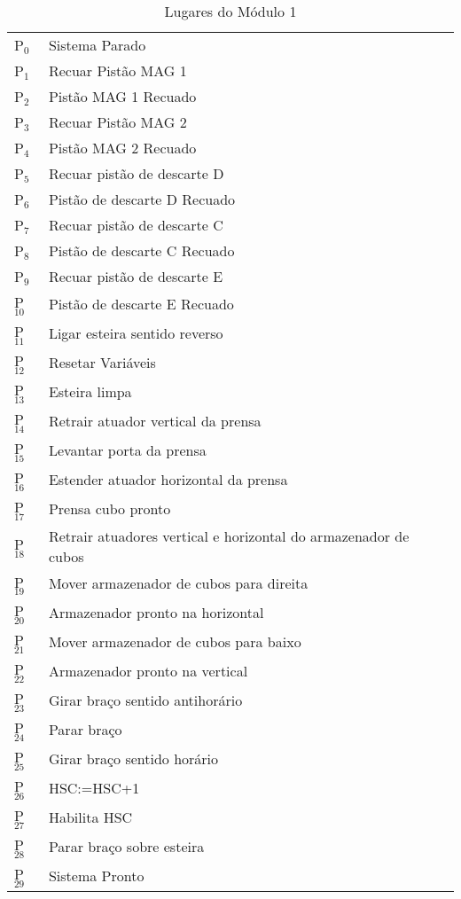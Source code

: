 \documentclass[11pt]{article}
\begin{document}
\begin{table}[htb]
\caption{Lugares do Módulo 1}
\centering
\begin{tabular}{ll}
P$_{\text{0}}$ & Sistema Parado\\
P$_{\text{1}}$ & Recuar Pistão MAG 1\\
P$_{\text{2}}$ & Pistão MAG 1 Recuado\\
P$_{\text{3}}$ & Recuar Pistão MAG 2\\
P$_{\text{4}}$ & Pistão MAG 2 Recuado\\
P$_{\text{5}}$ & Recuar pistão de descarte D\\
P$_{\text{6}}$ & Pistão de descarte D Recuado\\
P$_{\text{7}}$ & Recuar pistão de descarte C\\
P$_{\text{8}}$ & Pistão de descarte C Recuado\\
P$_{\text{9}}$ & Recuar pistão de descarte E\\
P$_{\text{10}}$ & Pistão de descarte E Recuado\\
P$_{\text{11}}$ & Ligar esteira sentido reverso\\
P$_{\text{12}}$ & Resetar Variáveis\footnotemark\\
P$_{\text{13}}$ & Esteira limpa\\
P$_{\text{14}}$ & Retrair atuador vertical da prensa\\
P$_{\text{15}}$ & Levantar porta da prensa\\
P$_{\text{16}}$ & Estender atuador horizontal da prensa\\
P$_{\text{17}}$ & Prensa cubo pronto\\
P$_{\text{18}}$ & Retrair atuadores vertical e horizontal do armazenador de cubos\\
P$_{\text{19}}$ & Mover armazenador de cubos para direita\\
P$_{\text{20}}$ & Armazenador pronto na horizontal\\
P$_{\text{21}}$ & Mover armazenador de cubos para baixo\\
P$_{\text{22}}$ & Armazenador pronto na vertical\\
P$_{\text{23}}$ & Girar braço sentido antihorário\footnotemark\\
P$_{\text{24}}$ & Parar braço\\
P$_{\text{25}}$ & Girar braço sentido horário\footnotemark[2]{}\\
P$_{\text{26}}$ & HSC:=HSC+1\\
P$_{\text{27}}$ & Habilita HSC\\
P$_{\text{28}}$ & Parar braço sobre esteira\\
P$_{\text{29}}$ & Sistema Pronto\\
\end{tabular}
\end{table}
\end{document}
